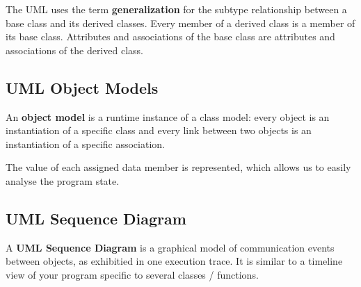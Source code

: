 \documentclass[12pt]{article}
\begin{document}
The UML uses the term {\bf generalization} for the subtype relationship between a base class and its derived classes. Every member of a derived class is a member of its base class. Attributes and associations of the base class are attributes and associations of the derived class.

\subsection{UML Object Models}
An {\bf object model} is a runtime instance of a class model: every object is an instantiation of a specific class and every link between two objects is an instantiation of a specific association.

The value of each assigned data member is represented, which allows us to easily analyse the program state.

\subsection{UML Sequence Diagram}
A {\bf UML Sequence Diagram} is a graphical model of communication events between objects, as exhibitied in one execution trace. It is similar to a timeline view of your program specific to several classes / functions.
\end{document}
